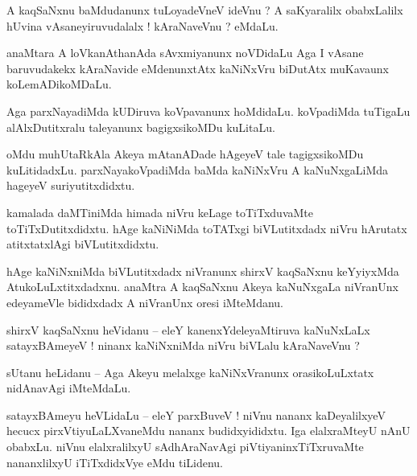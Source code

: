 \documentclass{article}
\begin{document}
\begin{mn}%
A kaqSaNxnu baMdudanunx tuLoyadeVneV  ideVnu ? A saKyaralilx obabxLalilx hUvina vAsaneyiruvudalalx 
! kAraNaveVnu ? eMdaLu.
\end{mn}

\begin{mn}%
anaMtara A loVkanAthanAda sAvxmiyanunx noVDidaLu Aga I vAsane baruvudakekx kAraNavide eMdenunxtAtx 
kaNiNxVru biDutAtx muKavaunx koLemADikoMDaLu.
\end{mn}

\begin{mn}%
Aga parxNayadiMda kUDiruva koVpavanunx hoMdidaLu. koVpadiMda tuTigaLu alAlxDutitxralu taleyanunx 
bagigxsikoMDu kuLitaLu.
\end{mn}

\begin{mn}%
oMdu muhUtaRkAla Akeya mAtanADade hAgeyeV tale tagigxsikoMDu kuLitidadxLu. parxNayakoVpadiMda baMda 
kaNiNxVru A kaNuNxgaLiMda hageyeV suriyutitxdidxtu.
\end{mn}

\begin{mn}%
kamalada daMTiniMda himada niVru keLage toTiTxduvaMte toTiTxDutitxdidxtu. hAge kaNiNiMda toTATxgi 
biVLutitxdadx niVru hArutatx atitxtatxlAgi biVLutitxdidxtu.
\end{mn}

\begin{mn}%
hAge kaNiNxniMda biVLutitxdadx niVranunx shirxV kaqSaNxnu keYyiyxMda AtukoLuLxtitxdadxnu. anaMtra A 
kaqSaNxnu Akeya kaNuNxgaLa niVranUnx edeyameVle bididxdadx A niVranUnx oresi iMteMdanu.
\end{mn}

\begin{mn}%
shirxV kaqSaNxnu heVidanu -- eleY kanenxYdeleyaMtiruva kaNuNxLaLx satayxBAmeyeV ! ninanx 
kaNiNxniMda niVru  biVLalu kAraNaveVnu ?
\end{mn}

\begin{mn}%
sUtanu heLidanu -- Aga Akeyu melalxge kaNiNxVranunx orasikoLuLxtatx nidAnavAgi iMteMdaLu.
\end{mn}

\begin{mn}%
satayxBAmeyu heVLidaLu -- eleY parxBuveV ! niVnu nananx kaDeyalilxyeV hecucx pirxVtiyuLaLXvaneMdu 
nananx budidxyididxtu. Iga elalxraMteyU nAnU obabxLu. niVnu elalxralilxyU sAdhAraNavAgi 
piVtiyaninxTiTxruvaMte nananxlilxyU iTiTxdidxVye eMdu tiLidenu.
\end{mn}
\end{document}
